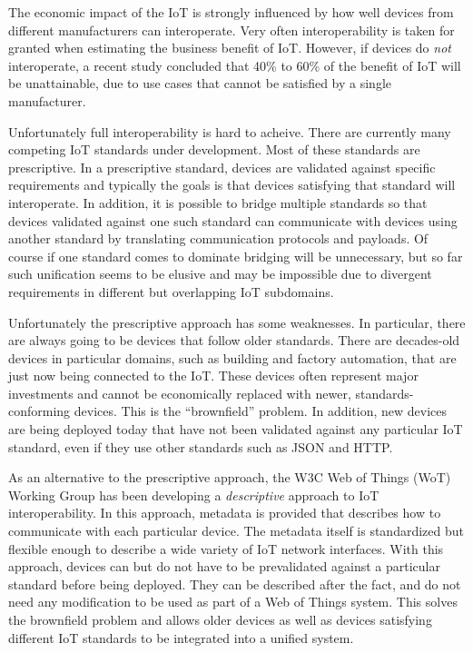 The economic impact of the IoT is strongly influenced by how well devices from 
different manufacturers can interoperate.
Very often interoperability is taken for granted when estimating the business
benefit of IoT. 
However, if devices do \emph{not} interoperate,
a recent study \cite{McK2015a} concluded that 40\% to 60\% of the 
benefit of IoT will be unattainable,
due to use cases that cannot be satisfied by a single manufacturer.

Unfortunately full interoperability is hard to acheive.
There are currently many competing IoT standards under development.
Most of these standards are prescriptive.
In a prescriptive standard, devices are validated against specific requirements
and typically the goals is that devices satisfying that standard will interoperate.
In addition, it is possible to bridge multiple standards so that
devices validated against one such standard can communicate with
devices using another standard by translating communication protocols and payloads.
Of course if one standard comes to dominate bridging will be unnecessary,
but so far such unification seems to be elusive and may be impossible due to
divergent requirements in different but overlapping IoT subdomains.

Unfortunately the prescriptive approach has some weaknesses.
In particular, there are always going to be devices that follow older standards.
There are decades-old devices in particular domains, such as building and factory
automation, that are just now being connected to the IoT.
These devices often represent major investments and cannot be economically replaced with newer,
standards-conforming devices.
This is the ``brownfield'' problem.
In addition, new devices are being deployed today that have not been validated
against any particular IoT standard,
even if they use other standards such as JSON and HTTP.

As an alternative to the prescriptive approach,
the W3C Web of Things (WoT) Working Group has been developing a \emph{descriptive} 
approach to IoT interoperability.
In this approach,
metadata is provided that describes how to communicate with each particular device.
The metadata itself is standardized but flexible enough to describe a wide variety of
IoT network interfaces.
With this approach,
devices can but do not have to be prevalidated against 
a particular standard before being deployed.
They can be described after the fact, and do not need any modification to be
used as part of a Web of Things system.
This solves the brownfield problem and allows
older devices as well as devices satisfying different IoT 
standards to be integrated into a unified system.  

